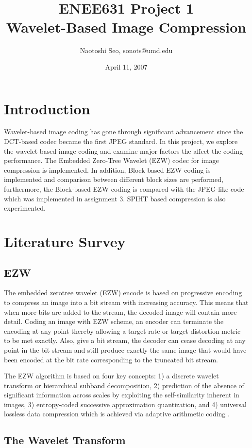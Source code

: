 \documentclass[article,oneside]{memoir}
\title {ENEE631 Project 1 \\ Wavelet-Based Image Compression}
\author{Naotoshi Seo, sonots@umd.edu}
\date{April 11, 2007}
\begin{document}
\maketitle


\chapter{Introduction}

Wavelet-based image coding has gone through significant advancement since the DCT-based codec became the first JPEG standard. In this project, we explore the wavelet-based image coding and examine major factors the affect the coding performance. The Embedded Zero-Tree Wavelet (EZW) codec for image compression is implemented. In addition, Block-based EZW coding is implemented and comparison between different block sizes are performed, furthermore, the Block-based EZW coding is compared with the JPEG-like code which was implemented in assignment 3. SPIHT based compression is also experimented. 

\chapter{Literature Survey}

\section{EZW}
The embedded zerotree wavelet (EZW) encode is based on progressive encoding to compress an image into a bit stream with increasing accuracy. This means that when more bits are added to the stream, the decoded image will contain more detail. Coding an image with EZW scheme, an encoder can terminate the encoding at any point thereby allowing a target rate or target distortion metric to be met exactly. Also, give a bit stream, the decoder can cease decoding at any point in the bit stream and still produce exactly the same image that would have been encoded at the bit rate corresponding to the truncated bit stream. 

The EZW algorithm is based on four key concepts: 1) a discrete wavelet transform or hierarchical subband decomposition, 2) prediction of the absence of significant information across scales by exploiting the self-similarity inherent in images, 3) entropy-coded successive approximation quantization, and 4) universal lossless data compression which is achieved via adaptive arithmetic coding \cite{Shapiro}. 


\section{The Wavelet Transform}
\end{document}
